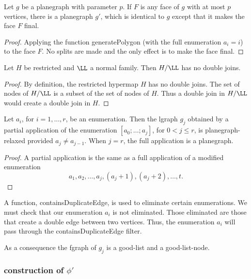 \begin{lemma}
  Let $g$ be a planegraph with parameter $p$.  If $F$ is any face of
  $g$ with at most $p$ vertices, there is a planegraph $g'$, which is
  identical to $g$ except that it makes the face $F$ final.
\end{lemma} 

\begin{proof}
  Applying the function generatePolygon (with the full enumeration
  $a_i=i$) to the face $F$.  No splits are made and the only effect is
  to make the face final.
\end{proof}

\begin{lemma} Let $H$ be restricted and $\LL$ a normal family.
Then $H/\LL$ has no double joins.
\end{lemma} 

\begin{proof}
By definition, the restricted hypermap $H$  has no double joins.
The set of nodes of $H/\LL$ is a subset of the set of nodes of $H$.
Thus a double join in $H/\LL$ would create a double join in $H$.
\end{proof}


\begin{lemma}  
Let $a_i$, for $i=1,\ldots,r$, be an enumeration.  
Then the lgraph $g_j$ obtained by a partial application of
the enumeration $[a_0;\ldots;a_j]$, for $0<j\le r$, is 
planegraph-relaxed provided $a_j \ne a_{j-1}$.
When $j=r$, the  full application is a planegraph.
\end{lemma} 

\begin{proof} A partial application is the same as a full application
of a modified enumeration
\[
a_1,a_2,\ldots,a_j,(a_j+1),(a_j+2),\ldots,t.
\]
\end{proof}

\begin{remark}
A function, containsDuplicateEdge, is used to eliminate certain
enumerations.  We must check that our enumeration $a_i$ is not
eliminated.  Those eliminated are those that create a double edge
between two vertices.  Thus, the enumeration $a_i$ will pass through
the containsDuplicateEdge filter.
\end{remark}

As a consequence the fgraph of $g_j$ is a good-list and a
good-list-node.

\subsubsection{construction of $\phi'$}

